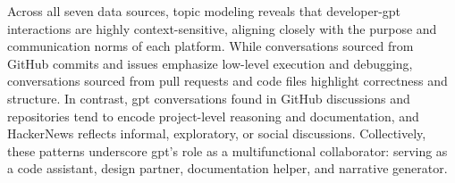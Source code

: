 Across all seven data sources, topic modeling reveals that developer-\acrshort{gpt} interactions are highly context-sensitive, aligning closely with the purpose and communication norms of each platform. While conversations sourced from GitHub commits and issues emphasize low-level execution and debugging, conversations sourced from pull requests and code files highlight correctness and structure. In contrast, \acrshort{gpt} conversations found in GitHub discussions and repositories tend to encode project-level reasoning and documentation, and HackerNews reflects informal, exploratory, or social discussions. Collectively, these patterns underscore \acrshort{gpt}'s role as a multifunctional collaborator: serving as a code assistant, design partner, documentation helper, and narrative generator.